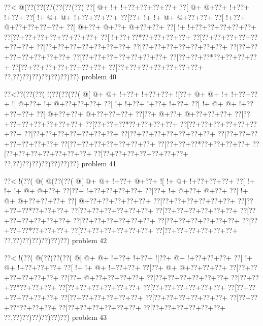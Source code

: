 \vbox{\vbox{\goo
\0??<\- @(\0??(\0??(\0??(\0??(\0??(\0??(
\0??[\- @+\- !+\- !+\0??+\0??+\0??+\0??+
\0??[\- @+\- @+\0??+\- !+\0??+\- !+\0??+
\0??[\- !+\- @+\- @+\- !+\0??+\0??+\0??+
\0??[\0??+\- !+\- !+\- @+\- @+\0??+\0??+
\0??[\- !+\0??+\- @+\0??+\0??+\0??+\0??+
\0??[\- @+\0??+\- @+\0??+\- @+\0??+\0??+
\0??[\- !+\- !+\0??+\0??+\0??+\0??+\0??+
\0??[\0??+\0??+\0??+\0??+\0??+\0??+\0??+
\0??[\- !+\0??+\0??*\0??+\0??+\0??+\0??+
\0??[\0??+\0??+\0??+\0??+\0??+\0??+\0??+
\0??[\0??+\0??+\0??+\0??+\0??+\0??+\0??+
\0??[\0??+\0??+\0??+\0??+\0??+\0??+\0??+
\0??[\0??+\0??+\0??+\0??+\0??+\0??+\0??+
\0??[\0??+\0??+\0??+\0??+\0??+\0??+\0??+
\0??[\0??+\0??+\0??*\0??+\0??+\0??+\0??+
\0??[\0??+\0??+\0??+\0??+\0??+\0??+\0??+
\0??[\0??+\0??+\0??+\0??+\0??+\0??+\0??+
\0??,\0??)\0??)\0??)\0??)\0??)\0??)\0??)
}
\hfil problem 40\hfil\break
}

\vbox{\vbox{\goo
\0??<\0??(\0??(\0??(\- !(\0??(\0??(\0??(
\- @[\- @+\- @+\- !+\0??+\- !+\0??+\0??+
\- ![\0??+\- @+\- @+\- !+\- !+\0??+\0??+
\- ![\- @+\0??+\- !+\- @+\0??+\0??+\0??+
\0??[\- !+\- !+\0??+\- !+\0??+\- !+\0??+
\0??[\- !+\- @+\- @+\- !+\0??+\0??+\0??+
\0??[\- @+\0??+\0??+\- @+\0??+\0??+\0??+
\0??[\0??+\- @+\0??+\- @+\0??+\0??+\0??+
\0??[\0??+\0??+\0??+\0??+\0??+\0??+\0??+
\0??[\0??+\0??+\0??*\0??+\0??+\0??+\0??+
\0??[\0??+\0??+\0??+\0??+\0??+\0??+\0??+
\0??[\0??+\0??+\0??+\0??+\0??+\0??+\0??+
\0??[\0??+\0??+\0??+\0??+\0??+\0??+\0??+
\0??[\0??+\0??+\0??+\0??+\0??+\0??+\0??+
\0??[\0??+\0??+\0??+\0??+\0??+\0??+\0??+
\0??[\0??+\0??+\0??*\0??+\0??+\0??+\0??+
\0??[\0??+\0??+\0??+\0??+\0??+\0??+\0??+
\0??[\0??+\0??+\0??+\0??+\0??+\0??+\0??+
\0??,\0??)\0??)\0??)\0??)\0??)\0??)\0??)
}
\hfil problem 41\hfil\break
}

\vbox{\vbox{\goo
\0??<\- !(\0??(\- @(\- @(\0??(\0??(
\- @[\- @+\- @+\- !+\0??+\- @+\0??+
\- ![\- !+\- @+\- !+\0??+\0??+\0??+
\0??[\- !+\- !+\- !+\- @+\- @+\0??+
\0??[\0??+\- !+\0??+\0??+\0??+\0??+
\0??[\0??+\- !+\- @+\0??+\- @+\0??+
\0??[\- !+\- @+\- @+\0??+\0??+\0??+
\0??[\- @+\0??+\0??+\0??+\0??+\0??+
\0??[\0??+\0??+\0??+\0??+\0??+\0??+
\0??[\0??+\0??+\0??*\0??+\0??+\0??+
\0??[\0??+\0??+\0??+\0??+\0??+\0??+
\0??[\0??+\0??+\0??+\0??+\0??+\0??+
\0??[\0??+\0??+\0??+\0??+\0??+\0??+
\0??[\0??+\0??+\0??+\0??+\0??+\0??+
\0??[\0??+\0??+\0??+\0??+\0??+\0??+
\0??[\0??+\0??+\0??*\0??+\0??+\0??+
\0??[\0??+\0??+\0??+\0??+\0??+\0??+
\0??[\0??+\0??+\0??+\0??+\0??+\0??+
\0??,\0??)\0??)\0??)\0??)\0??)\0??)
}
\hfil problem 42\hfil\break
}

\vbox{\vbox{\goo
\0??<\- !(\0??(\- @(\0??(\0??(\0??(
\- @[\- @+\- @+\- !+\0??+\- !+\0??+
\- ![\0??+\- @+\- !+\0??+\0??+\0??+
\0??[\- !+\- @+\- !+\0??+\0??+\0??+
\0??[\- !+\- !+\- @+\- !+\0??+\0??+
\0??[\0??+\- @+\- @+\0??+\0??+\0??+
\0??[\0??+\0??+\0??+\0??+\0??+\0??+
\0??[\0??+\- @+\0??+\0??+\0??+\0??+
\0??[\0??+\0??+\0??+\0??+\0??+\0??+
\0??[\0??+\0??+\0??*\0??+\0??+\0??+
\0??[\0??+\0??+\0??+\0??+\0??+\0??+
\0??[\0??+\0??+\0??+\0??+\0??+\0??+
\0??[\0??+\0??+\0??+\0??+\0??+\0??+
\0??[\0??+\0??+\0??+\0??+\0??+\0??+
\0??[\0??+\0??+\0??+\0??+\0??+\0??+
\0??[\0??+\0??+\0??*\0??+\0??+\0??+
\0??[\0??+\0??+\0??+\0??+\0??+\0??+
\0??[\0??+\0??+\0??+\0??+\0??+\0??+
\0??,\0??)\0??)\0??)\0??)\0??)\0??)
}
\hfil problem 43\hfil\break
}

